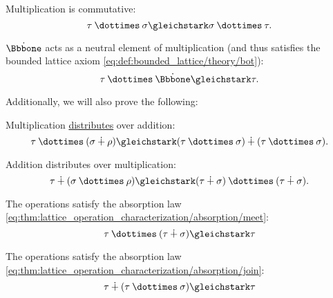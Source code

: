 \begin{proposition}
\begin{thmenum}[resume=thm:simple_algebraic_type_arithmetic]
     Multiplication is commutative:
    \begin{equation}\label{eq:thm:simple_algebraic_type_arithmetic/multiplication_commutative}
      \tau \syntimes \sigma \gleichstark \sigma \syntimes \tau.
    \end{equation}

     \( \syn\Bbbone \) acts as a neutral element of multiplication (and thus satisfies the bounded lattice axiom \eqref{eq:def:bounded_lattice/theory/bot}):
    \begin{equation}\label{eq:thm:simple_algebraic_type_arithmetic/multiplication_neutral}
      \tau \syntimes \syn\Bbbone \gleichstark \tau.
    \end{equation}
  \end{thmenum}

  Additionally, we will also prove the following:
  \begin{thmenum}[resume=thm:simple_algebraic_type_arithmetic]
     Multiplication \hyperref[def:semiring]{distributes} over addition:
    \begin{equation}\label{eq:thm:simple_algebraic_type_arithmetic/multiplication_distributes}
      \tau \syntimes (\sigma \synplus \rho) \gleichstark (\tau \syntimes \sigma) \synplus (\tau \syntimes \sigma).
    \end{equation}

     Addition distributes over multiplication:
    \begin{equation}\label{eq:thm:simple_algebraic_type_arithmetic/addition_distributes}
      \tau \synplus (\sigma \syntimes \rho) \gleichstark (\tau \synplus \sigma) \syntimes (\tau \synplus \sigma).
    \end{equation}

     The operations satisfy the absorption law \eqref{eq:thm:lattice_operation_characterization/absorption/meet}:
    \begin{equation}\label{eq:thm:simple_algebraic_type_arithmetic/multiplication_absorbs}
      \tau \syntimes (\tau \synplus \sigma) \gleichstark \tau
    \end{equation}

     The operations satisfy the absorption law \eqref{eq:thm:lattice_operation_characterization/absorption/join}:
    \begin{equation}\label{eq:thm:simple_algebraic_type_arithmetic/addition_absorbs}
      \tau \synplus (\tau \syntimes \sigma) \gleichstark \tau
    \end{equation}
  \end{thmenum}
\end{proposition}
